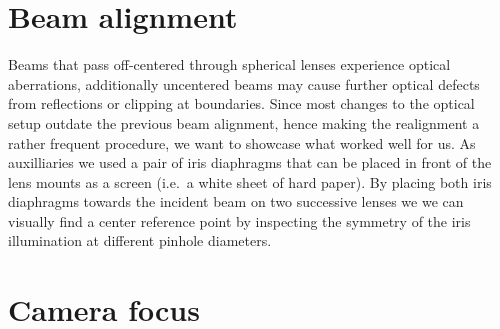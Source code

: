 \section{Beam alignment}

Beams that pass off-centered through spherical lenses experience optical
aberrations, additionally uncentered beams may cause further optical defects
from reflections or clipping at boundaries. Since most changes to the optical
setup outdate the previous beam alignment, hence making the realignment
a rather frequent procedure, we want to showcase what worked well for us.
As auxilliaries we used a pair of iris diaphragms that can be placed in front
of the lens mounts as a screen (i.e.\ a white sheet of hard paper). By placing
both iris diaphragms towards the incident beam on two successive lenses we
we can visually find a center reference point by inspecting the symmetry of
the iris illumination at different pinhole diameters.

\section{Camera focus}

